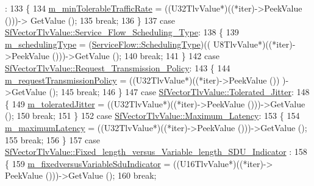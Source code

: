 \begin{DoxyCode}
      :
133           \{
134             \hyperlink{classns3_1_1ServiceFlow_a3b8d632776a81daa9306c1e976685aee}{m\_minTolerableTrafficRate} = ((U32TlvValue*)((*iter)->PeekValue ()))->
      GetValue ();
135             \textcolor{keywordflow}{break};
136           \}
137         \textcolor{keywordflow}{case} \hyperlink{classns3_1_1SfVectorTlvValue_aa23ab5c7acfce609dbfe28024c6d2ef7ad6aa9ed8976f134fcd3b2d1db6c735d3}{SfVectorTlvValue::Service\_Flow\_Scheduling\_Type}:
138           \{
139             \hyperlink{classns3_1_1ServiceFlow_a2d3227119fefd7969d145645cdb693af}{m\_schedulingType} = (\hyperlink{classns3_1_1ServiceFlow_a7990ba10be1e098328fd1e6382a26235}{ServiceFlow::SchedulingType})((
      U8TlvValue*)((*iter)->PeekValue ()))->GetValue ();
140             \textcolor{keywordflow}{break};
141           \}
142         \textcolor{keywordflow}{case} \hyperlink{classns3_1_1SfVectorTlvValue_aa23ab5c7acfce609dbfe28024c6d2ef7a5cae94472b899daf64b8c567869598e0}{SfVectorTlvValue::Request\_Transmission\_Policy}:
143           \{
144             \hyperlink{classns3_1_1ServiceFlow_a019520fe5d683d8c79465830166815ce}{m\_requestTransmissionPolicy} = ((U32TlvValue*)((*iter)->PeekValue ())
      )->GetValue ();
145             \textcolor{keywordflow}{break};
146           \}
147         \textcolor{keywordflow}{case} \hyperlink{classns3_1_1SfVectorTlvValue_aa23ab5c7acfce609dbfe28024c6d2ef7a0877f8cceaae9a062f1c1628dc7b3f0e}{SfVectorTlvValue::Tolerated\_Jitter}:
148           \{
149             \hyperlink{classns3_1_1ServiceFlow_a225bda97e6281ab2c5a5d1b9682bf21b}{m\_toleratedJitter} = ((U32TlvValue*)((*iter)->PeekValue ()))->GetValue ();
150             \textcolor{keywordflow}{break};
151           \}
152         \textcolor{keywordflow}{case} \hyperlink{classns3_1_1SfVectorTlvValue_aa23ab5c7acfce609dbfe28024c6d2ef7a0561c6484a59b77a2a7b71bb09a0938e}{SfVectorTlvValue::Maximum\_Latency}:
153           \{
154             \hyperlink{classns3_1_1ServiceFlow_a3b511a39a2dc94f5649b127c9e7a2073}{m\_maximumLatency} = ((U32TlvValue*)((*iter)->PeekValue ()))->GetValue ();
155             \textcolor{keywordflow}{break};
156           \}
157         \textcolor{keywordflow}{case} \hyperlink{classns3_1_1SfVectorTlvValue_aa23ab5c7acfce609dbfe28024c6d2ef7a067be329e4d6013e4c1d1e71758d687c}{SfVectorTlvValue::Fixed\_length\_versus\_Variable\_length\_SDU\_Indicator}
      :
158           \{
159             \hyperlink{classns3_1_1ServiceFlow_abcc372b51b2b646d66af51fb2231a183}{m\_fixedversusVariableSduIndicator} = ((U16TlvValue*)((*iter)->
      PeekValue ()))->GetValue ();
160             \textcolor{keywordflow}{break};

\end{DoxyCode}
